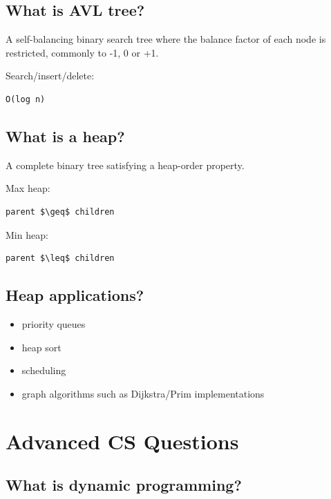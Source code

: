 \subsection{What is AVL tree?}

A self-balancing binary search tree where the balance factor of each node is restricted, commonly to -1, 0 or +1.

Search/insert/delete:

\begin{lstlisting}
O(log n)
\end{lstlisting}

\medskip

\subsection{What is a heap?}

A complete binary tree satisfying a heap-order property.

Max heap:

\begin{lstlisting}
parent $\geq$ children
\end{lstlisting}

Min heap:

\begin{lstlisting}
parent $\leq$ children
\end{lstlisting}

\medskip

\subsection{Heap applications?}

\begin{itemize}
  \item priority queues
  \item heap sort
  \item scheduling
  \item graph algorithms such as Dijkstra/Prim implementations
\end{itemize}

\medskip

\section{Advanced CS Questions}

\subsection{What is dynamic programming?}

